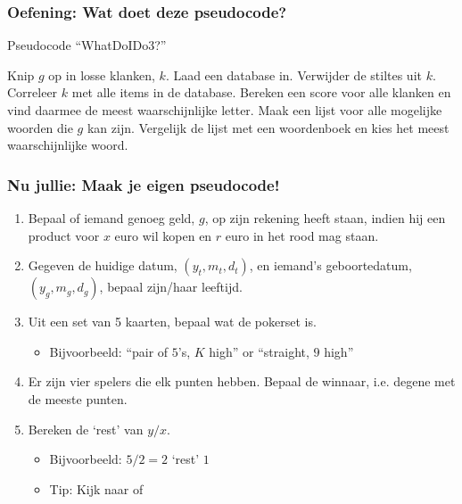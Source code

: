 \begin{frame}
\frametitle{Oefening: Wat doet deze pseudocode?}

\begin{algorithm}[H]
\caption{Pseudocode ``WhatDoIDo3?''}
\begin{algorithmic}[1]
\State Knip $g$ op in losse klanken, $k$.
\State Laad een database in.
\State Verwijder de stiltes uit $k$.
\State Correleer $k$ met alle items in de database.
\State Bereken een score voor alle klanken en vind daarmee de meest waarschijnlijke letter.
\State Maak een lijst voor alle mogelijke woorden die $g$ kan zijn.
\State Vergelijk de lijst met een woordenboek en kies het meest waarschijnlijke woord.
\EndFunction
\end{algorithmic}
\end{algorithm}


\end{frame}



\begin{frame}\label{frame:pseudo_exercises}
\frametitle{Nu jullie: Maak je eigen pseudocode!}

\begin{enumerate} 
  \item Bepaal of iemand genoeg geld, $g$, op zijn rekening heeft staan, indien hij een product voor $x$ euro wil kopen
  	en $r$ euro in het rood mag staan.
  \item Gegeven de huidige datum, $(y_t, m_t, d_t)$, en iemand's geboortedatum, $(y_g, m_g, d_g)$, bepaal zijn/haar leeftijd.
  \item Uit een set van 5 kaarten, bepaal wat de pokerset is.
  \begin{itemize}
    \item Bijvoorbeeld: ``pair of $5$'s, $K$ high'' or ``straight, $9$ high''
  \end{itemize}
  \item Er zijn vier spelers die elk punten hebben. Bepaal de winnaar, i.e. degene met de meeste punten.
  \item Bereken de `rest' van $y/x$.
  \begin{itemize}
    \item Bijvoorbeeld: $5/2 = 2$ `rest' $1$
    \item Tip: Kijk naar \tiMATH{} of \tiMATH{}
  \end{itemize}
\end{enumerate}

\end{frame}






